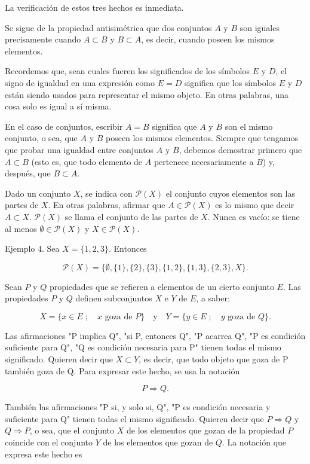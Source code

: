 La verificación de estos tres hechos es inmediata.

Se sigue de la propiedad antisimétrica que dos conjuntos \(A\) y \(B\) son iguales precisamente cuando \(A \subset B\) y \(B \subset A\), es decir, cuando poseen los mismos elementos.

Recordemos que, sean cuales fueren los significados de los símbolos \(E\) y \(D\), el signo de igualdad en una expresión como \(E = D\) significa que los símbolos \(E\) y \(D\) están siendo usados para representar el mismo objeto. En otras palabras, una cosa solo es igual a sí misma.

En el caso de conjuntos, escribir \(A = B\) significa que \(A\) y \(B\) son el mismo conjunto, o sea, que \(A\) y \(B\) poseen los mismos elementos. Siempre que tengamos que probar una igualdad entre conjuntos \(A\) y \(B\), debemos demostrar primero que \(A \subset B\) (esto es, que todo elemento de \(A\) pertenece necesariamente a \(B\)) y, después, que \(B \subset A\).

Dado un conjunto \(X\), se indica con \(\mathcal{P}(X)\) el conjunto cuyos elementos son las partes de \(X\). En otras palabras, afirmar que \(A \in \mathcal{P}(X)\) es lo mismo que decir \(A \subset X\). \(\mathcal{P}(X)\) se llama el conjunto de las partes de \(X\). Nunca es vacío: se tiene al menos \(\emptyset \in \mathcal{P}(X)\) y \(X \in \mathcal{P}(X)\).

Ejemplo 4. Sea \(X = \{1, 2, 3\}\). Entonces

\[
\mathcal{P}(X) = \{\emptyset, \{1\}, \{2\}, \{3\}, \{1, 2\}, \{1, 3\}, \{2, 3\}, X\}.
\]

Sean \(P\) y \(Q\) propiedades que se refieren a elementos de un cierto conjunto \(E\). Las propiedades \(P\) y \(Q\) definen subconjuntos \(X\) e \(Y\) de \(E\), a saber:

\[
X = \{x \in E \; ; \quad x \text{ goza de } P\} \quad \text{y} \quad Y = \{y \in E \; ; \quad y \text{ goza de } Q\}.
\]

Las afirmaciones "P implica Q", "si P, entonces Q", "P acarrea Q", "P es condición suficiente para Q", "Q es condición necesaria para P" tienen todas el mismo significado. Quieren decir que \(X \subset Y\), es decir, que todo objeto que goza de P también goza de Q. Para expresar este hecho, se usa la notación

\[
P \Rightarrow Q.
\]

También las afirmaciones "P si, y solo si, Q", "P es condición necesaria y suficiente para Q" tienen todas el mismo significado. Quieren decir que \(P \Rightarrow Q\) y \(Q \Rightarrow P\), o sea, que el conjunto \(X\) de los elementos que gozan de la propiedad \(P\) coincide con el conjunto \(Y\) de los elementos que gozan de \(Q\). La notación que expresa este hecho es

